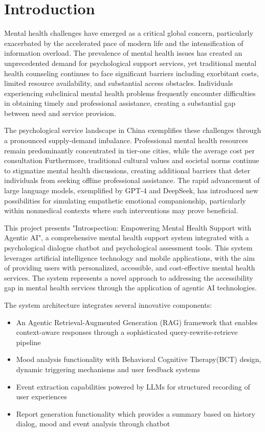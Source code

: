 \section{Introduction}
\label{sec:introduction}

Mental health challenges have emerged as a critical global concern, particularly exacerbated by the accelerated pace of modern life and the intensification of information overload. The prevalence of mental health issues has created an unprecedented demand for psychological support services, yet traditional mental health counseling continues to face significant barriers including exorbitant costs, limited resource availability, and substantial access obstacles. Individuals experiencing subclinical mental health problems frequently encounter difficulties in obtaining timely and professional assistance, creating a substantial gap between need and service provision.

The psychological service landscape in China exemplifies these challenges through a pronounced supply-demand imbalance. Professional mental health resources remain predominantly concentrated in tier-one cities, while the average cost per consultation Furthermore, traditional cultural values and societal norms continue to stigmatize mental health discussions, creating additional barriers that deter individuals from seeking offline professional assistance. The rapid advancement of large language models, exemplified by GPT-4 and DeepSeek, has introduced new possibilities for simulating empathetic emotional companionship, particularly within nonmedical contexts where such interventions may prove beneficial.

This project presents "Introspection: Empowering Mental Health Support with Agentic AI", a comprehensive mental health support system integrated with a psychological dialogue chatbot and psychological assessment tools.
This system leverages artificial intelligence technology and mobile applications, with the aim of providing users with personalized, accessible, and cost-effective mental health services. The system represents a novel approach to addressing the accessibility gap in mental health services through the application of agentic AI technologies.

The system architecture integrates several innovative components:
\begin{itemize}
\item An Agentic Retrieval-Augmented Generation (RAG) framework that enables context-aware responses through a sophisticated query-rewrite-retrieve pipeline
\item Mood analysis functionality with Behavioral Cognitive Therapy(BCT) design, dynamic triggering mechanisms and user feedback systems
\item Event extraction capabilities powered by LLMs for structured recording of user experiences
\item Report generation functionality which provides a summary based on history dialog, mood and event analysis through chatbot
\end{itemize}

